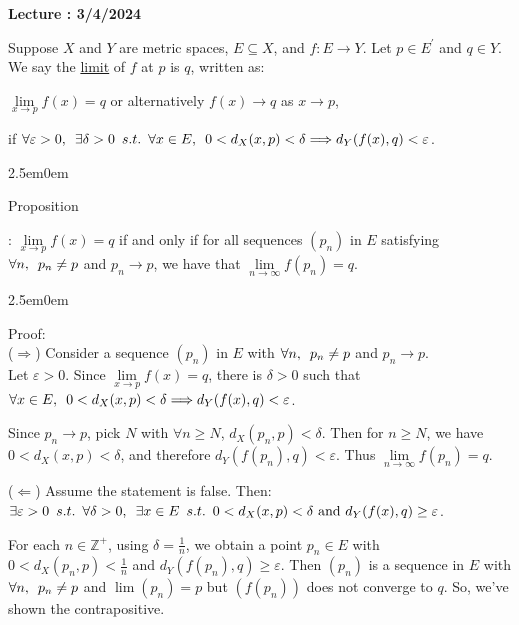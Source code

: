 \documentclass{book}
\newcommand{\hTwo}{%
   \color{MidnightBlue}%
   \fontsize{13}{15}\selectfont%
}
\newcommand{\hThree}{%
   \color{PineGreen}
   \fontsize{13}{15}\selectfont%
}
\newenvironment{myIndent}{%
   \begin{adjustwidth}{2.5em}{0em}%
}{%
   \end{adjustwidth}%
}
\newcommand{\udefine}[1]{%
   \setulcolor{Red}%
   \setul{0.14em}{0.07em}%
   \ul{#1}%
}
\newcommand{\retTwo}{\hfill\bigbreak}
\newcounter{LectureNumber}
\newcommand*{\markLecture}[1]{%
   \stepcounter{LectureNumber}%
   {\huge \color{Black} \textbf{Lecture \theLectureNumber: #1} \newline}%
}
\newcommand{\suchthat}{ \hspace{0.5em}s.t.\hspace{0.5em}}
\newcommand{\myHS}{ \hspace{0.5em}}
\newcounter{PropNumber}
\newcommand{\propCount}[1][1]{%
   \addtocounter{PropNumber}{#1}%
   \thePropNumber%
}
\begin{document}
   \newpage

   \markLecture{3/4/2024}

   Suppose $X$ and $Y$ are metric spaces, $E \subseteq X$, and $f: E\rightarrow Y$. Let $p \in E^\prime$ and $q \in Y$. We say the \udefine{limit} of $f$ at $p$ is $q$, written as:
   
   {\center $\lim\limits_{x\rightarrow p}f(x) = q$ or alternatively $f(x)\rightarrow q$ as $x \rightarrow p$,\\ [4pt]\par}

   if $\forall \varepsilon > 0, \myHS \exists \delta > 0 \suchthat \forall x \in E, \myHS 0 < d_X(x, p) < \delta \Longrightarrow d_Y(f(x), q) < \varepsilon$. \retTwo

   {\begin{myIndent} \hTwo
      Proposition \propCount: $\lim\limits_{x\rightarrow p}f(x) = q$ if and only if for all sequences $(p_n)$ in $E$ satisfying $\forall n,\myHS p_n \neq p$ and $p_n \rightarrow p$, we have that $\lim\limits_{n\rightarrow \infty}f(p_n) = q$. \retTwo

      {\begin{myIndent} \hThree
         Proof:\\
         ($\Longrightarrow$) Consider a sequence $(p_n)$ in $E$ with $\forall n, \myHS p_n \neq p$ and $p_n \rightarrow p$.\\ Let $\varepsilon > 0$. Since $\lim\limits_{x \rightarrow p}f(x) = q$, there is $\delta > 0$ such that\\ $\forall x \in E, \myHS 0 < d_X(x, p) < \delta \Longrightarrow d_Y(f(x), q) < \varepsilon$. \retTwo

         Since $p_n \rightarrow p$, pick $N$ with $\forall n \geq N$, $d_X(p_n, p) < \delta$. Then for $n \geq N$, we have $0 < d_X(x, p) < \delta$, and therefore $d_Y(f(p_n), q) < \varepsilon$. Thus $\lim\limits_{n\rightarrow \infty}f(p_n) = q$. \retTwo

         ($\Longleftarrow$) Assume the statement is false. Then:\\ $\exists \varepsilon > 0 \suchthat \forall \delta > 0, \myHS \exists x \in E \suchthat 0 < d_X(x, p) < \delta \text{ and } d_Y(f(x), q) \geq \varepsilon$. \retTwo

         For each $n \in \mathbb{Z}^+$, using $\delta = \frac{1}{n}$, we obtain a point $p_n \in E$ with\\ $0 < d_X(p_n, p) < \frac{1}{n}$ and $d_Y(f(p_n), q) \geq \varepsilon$. Then $(p_n)$ is a sequence in $E$ with $\forall n, \myHS p_n \neq p$ and $\lim(p_n) = p$ but $(f(p_n))$ does not converge to $q$. So, we've shown the contrapositive.\retTwo
      \end{myIndent}}


\end{myIndent}}
\end{document}
